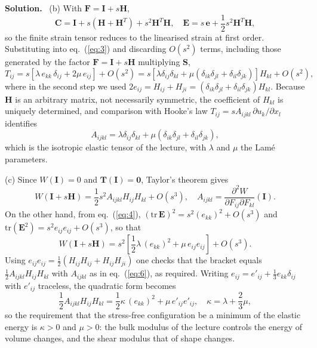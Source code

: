 \documentclass[a4paper,12pt]{paper}
\newenvironment{solution}{\par\noindent\textbf{Solution.}\ }{\par\medskip}
\begin{document}
\begin{solution}
(b) With $\mathbf{F}=\mathbf{I}+s\mathbf{H}$,
\begin{equation}
\mathbf{C}=\mathbf{I}+s(\mathbf{H}+\mathbf{H}^{T})+s^{2}\mathbf{H}^{T}\mathbf{H},\quad
\mathbf{E}=s\,\mathbf{e}+\frac{1}{2}s^{2}\mathbf{H}^{T}\mathbf{H},
\label{eq:4}
\end{equation}
so the finite strain tensor reduces to the linearised strain at first order. Substituting into
eq.~(\ref{eq:3}) and discarding $O(s^{2})$ terms, including those generated by the factor
$\mathbf{F}=\mathbf{I}+s\mathbf{H}$ multiplying $\mathbf{S}$,
\begin{equation}
T_{ij}=s\left[\lambda\,e_{kk}\,\delta_{ij}+2\mu\,e_{ij}\right]+O(s^{2})
=s\left[\lambda\delta_{ij}\delta_{kl}+\mu(\delta_{ik}\delta_{jl}+\delta_{il}\delta_{jk})\right]H_{kl}+O(s^{2}),
\label{eq:5}
\end{equation}
where in the second step we used $2e_{ij}=H_{ij}+H_{ji}=(\delta_{ik}\delta_{jl}+\delta_{il}\delta_{jk})H_{kl}$.
Because $\mathbf{H}$ is an arbitrary matrix, not necessarily symmetric, the coefficient of $H_{kl}$
is uniquely determined, and comparison with Hooke's law $T_{ij}=sA_{ijkl}\,\partial u_{k}/\partial x_{l}$
identifies
\begin{equation}
A_{ijkl}=\lambda\delta_{ij}\delta_{kl}+\mu(\delta_{ik}\delta_{jl}+\delta_{il}\delta_{jk}),
\label{eq:6}
\end{equation}
which is the isotropic elastic tensor of the lecture, with $\lambda$ and $\mu$ the Lam\'{e} parameters.

(c) Since $W(\mathbf{I})=0$ and $\mathbf{T}(\mathbf{I})=\mathbf{0}$, Taylor's theorem gives
\begin{equation}
W(\mathbf{I}+s\mathbf{H})=\frac{1}{2}s^{2}A_{ijkl}H_{ij}H_{kl}+O(s^{3}),\quad
A_{ijkl}=\frac{\partial^{2}W}{\partial F_{ij}\partial F_{kl}}(\mathbf{I}).
\label{eq:7}
\end{equation}
On the other hand, from
eq.~(\ref{eq:4}), $(\mathrm{tr}\,\mathbf{E})^{2}=s^{2}(e_{kk})^{2}+O(s^{3})$ and
$\mathrm{tr}(\mathbf{E}^{2})=s^{2}e_{ij}e_{ij}+O(s^{3})$, so that
\begin{equation}
W(\mathbf{I}+s\mathbf{H})=s^{2}\left[\frac{1}{2}\lambda\,(e_{kk})^{2}+\mu\,e_{ij}e_{ij}\right]+O(s^{3}).
\label{eq:8}
\end{equation}
Using $e_{ij}e_{ij}=\frac{1}{2}(H_{ij}H_{ij}+H_{ij}H_{ji})$ one checks that the bracket equals
$\frac{1}{2}A_{ijkl}H_{ij}H_{kl}$ with $A_{ijkl}$ as in eq.~(\ref{eq:6}), as required. Writing
$e_{ij}=e'_{ij}+\frac{1}{3}e_{kk}\delta_{ij}$ with $e'_{ij}$ traceless, the quadratic form becomes
\begin{equation}
\frac{1}{2}A_{ijkl}H_{ij}H_{kl}=\frac{1}{2}\kappa\,(e_{kk})^{2}+\mu\,e'_{ij}e'_{ij},\quad
\kappa=\lambda+\frac{2}{3}\mu,
\label{eq:9}
\end{equation}
so the requirement that the stress-free configuration be a minimum of the elastic energy is
$\kappa>0$ and $\mu>0$: the bulk modulus of the lecture controls the energy of volume changes, and
the shear modulus that of shape changes.
\end{solution}
\end{document}
